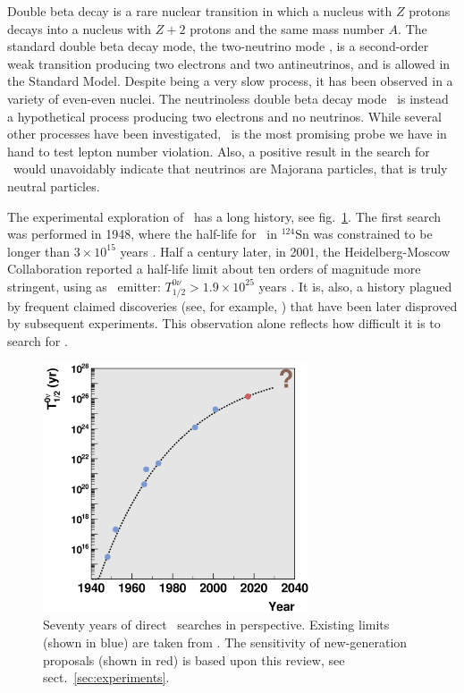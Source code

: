 Double beta decay is a rare nuclear transition in which a nucleus with $Z$ protons decays into a nucleus with $Z+2$ protons and the same mass number $A$. The standard double beta decay mode, the two-neutrino mode \bbtnu, is a second-order weak transition producing two electrons and two antineutrinos, and is allowed in the Standard Model. Despite being a very slow process, it has been observed in a variety of even-even nuclei. The neutrinoless double beta decay mode \bbonu\ is instead a hypothetical process producing two electrons and no neutrinos. While several other processes have been investigated, \bbonu\ is the most promising probe we have in hand to test lepton number violation. Also, a positive result in the search for \bbonu\ would unavoidably indicate that neutrinos are Majorana particles, that is truly neutral particles.  

The experimental exploration of \bbonu\ has a long history, see fig.~\ref{fig:bb0nusearches}. The first search was performed in 1948, where the half-life for \bbonu\ in $^{124}\text{Sn}$ was constrained to be longer than $3\times 10^{15}$ years \cite{Barabash:2011mf}. Half a century later, in 2001, the Heidelberg-Moscow Collaboration reported a half-life limit about ten orders of magnitude more stringent, using  as \bb\ emitter: $T_{1/2}^{0\nu}>1.9\times 10^{25}$ years \cite{Klapdor-Kleingrothaus:2000eir}. It is, also, a history plagued by frequent claimed discoveries (see, for example, \cite{Tretyak:2011pg}) that have been later disproved by subsequent experiments. This observation alone reflects how difficult it is to search for \bbonu.

\begin{figure}[t!b!]
\begin{center}
\includegraphics[width=0.70\textwidth]{img/bb0nusearches.eps}
\end{center}
\caption{Seventy years of direct \bbonu\ searches in perspective. Existing limits (shown in blue) are taken from \cite{Barabash:2011mf}. The sensitivity of new-generation proposals (shown in red) is based upon this review, see sect.~\ref{sec:experiments}.} \label{fig:bb0nusearches}
\end{figure}

